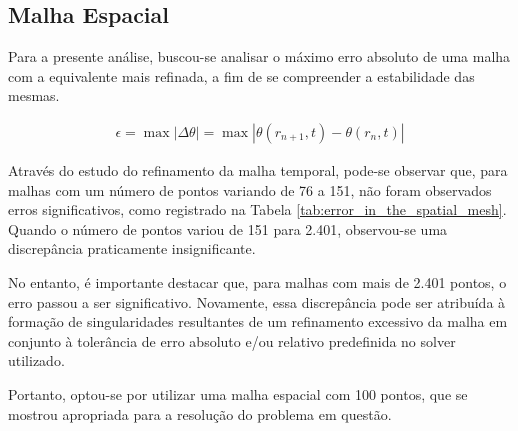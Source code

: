 
\subsection{Malha Espacial}


Para a presente análise, buscou-se analisar o máximo erro absoluto de uma malha com a equivalente mais refinada, a fim de se compreender a estabilidade das mesmas.

\begin{gather}
    \epsilon = \max | \Delta \theta | = \max | \theta(r_{n+1},t) - \theta(r_{n},t) |
\end{gather}

Através do estudo do refinamento da malha temporal, pode-se observar que, para malhas com um número de pontos variando de 76 a 151, não foram observados erros significativos, como registrado na Tabela \ref{tab:error_in_the_spatial_mesh}. Quando o número de pontos variou de 151 para 2.401, observou-se uma discrepância praticamente insignificante.

No entanto, é importante destacar que, para malhas com mais de 2.401 pontos, o erro passou a ser significativo. Novamente, essa discrepância pode ser atribuída à formação de singularidades resultantes de um refinamento excessivo da malha em conjunto à tolerância de erro absoluto e/ou relativo predefinida no solver utilizado.

Portanto, optou-se por utilizar uma malha espacial com 100 pontos, que se mostrou apropriada para a resolução do problema em questão.

